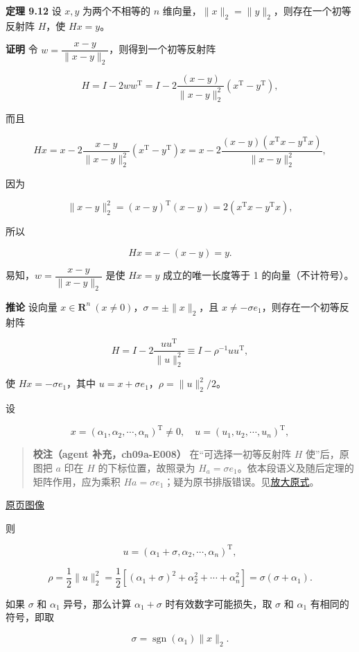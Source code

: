\documentclass[
  10pt,
  fontset=fandol]{ctexart}
\begin{document}
\textbf{定理 9.12} 设 \(x,y\) 为两个不相等的 \(n\) 维向量，\(\|x\|_2=\|y\|_2\)，则存在一个初等反射阵 \(H\)，使 \(Hx=y\)。

\textbf{证明} 令 \(w=\dfrac{x-y}{\|x-y\|_2}\)，则得到一个初等反射阵

\[
H=I-2ww^{\mathrm T}=I-2\frac{(x-y)}{\|x-y\|_2^2}(x^{\mathrm T}-y^{\mathrm T}),
\]

而且

\[
Hx=x-2\frac{x-y}{\|x-y\|_2^2}(x^{\mathrm T}-y^{\mathrm T})x=x-2\frac{(x-y)(x^{\mathrm T}x-y^{\mathrm T}x)}{\|x-y\|_2^2},
\]

因为

\[
\|x-y\|_2^2=(x-y)^{\mathrm T}(x-y)=2(x^{\mathrm T}x-y^{\mathrm T}x),
\]

所以

\[
Hx=x-(x-y)=y.
\]

易知，\(w=\dfrac{x-y}{\|x-y\|_2}\) 是使 \(Hx=y\) 成立的唯一长度等于 1 的向量（不计符号）。

\textbf{推论} 设向量 \(x\in\mathbf R^n\ (x\ne0)\)，\(\sigma=\pm\|x\|_2\)，且 \(x\ne-\sigma e_1\)，则存在一个初等反射阵

\[
H=I-2\frac{uu^{\mathrm T}}{\|u\|_2^2}\equiv I-\rho^{-1}uu^{\mathrm T},
\]

使 \(Hx=-\sigma e_1\)，其中 \(u=x+\sigma e_1\)，\(\rho=\|u\|_2^2/2\)。

设

\[
x=(\alpha_1,\alpha_2,\cdots,\alpha_n)^{\mathrm T}\ne0,\quad u=(u_1,u_2,\cdots,u_n)^{\mathrm T},
\]

\begin{quote}
\textbf{校注（agent 补充，ch09a-E008）} 在``可选择一初等反射阵 \(H\) 使''后，原图把 \(a\) 印在 \(H\) 的下标位置，故照录为 \(H_a=\sigma e_1\)。依本段语义及随后定理的矩阵作用，应为乘积 \(Ha=\sigma e_1\)；疑为原书排版错误。见\href{../assets/ch09a/review-p244-Ha.png}{放大原式}。
\end{quote}

\href{../../source-images/pdf-245.jpeg}{原页图像}

则

\[
u=(\alpha_1+\sigma,\alpha_2,\cdots,\alpha_n)^{\mathrm T},
\]

\[
\rho=\frac12\|u\|_2^2=\frac12\left[(\alpha_1+\sigma)^2+\alpha_2^2+\cdots+\alpha_n^2\right]=\sigma(\sigma+\alpha_1).
\]

如果 \(\sigma\) 和 \(\alpha_1\) 异号，那么计算 \(\alpha_1+\sigma\) 时有效数字可能损失，取 \(\sigma\) 和 \(\alpha_1\) 有相同的符号，即取

\[
\sigma=\operatorname{sgn}(\alpha_1)\|x\|_2.
\]
\end{document}
